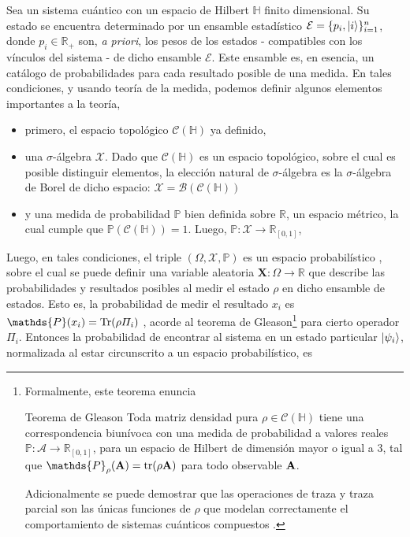 \documentclass{report} %
\numberwithin{equation}{section}
\begin{document}
Sea un sistema cuántico con un espacio de Hilbert $\mathds{H}$ finito dimensional. Su estado se encuentra determinado por un ensamble estadístico \cite{Nielsen.00, PATHRIA2011115} $\mathcal{E} = \{p_i,\ket{i}\}_{i=1}^{n}$, donde $p_i \in \mathds{R}_{+}$ son, \textit{a priori}, los pesos de los estados - compatibles con los vínculos del sistema - de dicho ensamble $\mathcal{E}$. Este ensamble es, en esencia, un catálogo de probabilidades para cada resultado posible de una medida. En tales condiciones, y usando teoría de la medida, podemos definir algunos elementos importantes a la teoría,

\begin{itemize}
    \item primero, el espacio topológico $\mathcal{C}(\mathds{H})$ ya definido,
    \item una $\sigma$-álgebra $\mathcal{X}$. Dado que  $\mathcal{C}(\mathds{H})$ es un espacio topológico, sobre el cual es posible distinguir elementos, la elección natural de $\sigma$-álgebra es la $\sigma$-álgebra de Borel de dicho espacio: $\mathcal{X} = \mathcal{B}(\mathcal{C}(\mathds{H}))$
    \item y una medida de probabilidad $\mathds{P}$ bien definida sobre $\mathds{R}$, un espacio métrico, la cual cumple que $\mathds{P}(\mathcal{C}(\mathds{H})) = 1.$ Luego, $\mathds{P}: \mathcal{X} \rightarrow \mathds{R}_{[0,1]}$, 
\end{itemize}

Luego, en tales condiciones, el triple $(\Omega, \mathcal{X}, \mathds{P})$ es un espacio probabilístico \cite{Bartle1995, munkres}, sobre el cual se puede definir una variable aleatoria $\mathbf{X}: \Omega \rightarrow \mathds{R}$ que describe las probabilidades y resultados posibles al medir el estado $\rho$ en dicho ensamble de estados. Esto es, la probabilidad de medir el resultado $x_i$ es $\mathds{P}(x_i) = \Tr(\rho \Pi_i)$ \cite{HeinzPetruccione, Portesi-ECI34, Holik-ECI34}, acorde al teorema de Gleason\footnote{Formalmente, este teorema enuncia 

\begin{theo}{Teorema de Gleason}{}
Toda matriz densidad pura $\rho \in \mathcal{C}(\mathds{H})$ tiene una correspondencia biunívoca con una medida de probabilidad a valores reales $\mathds{P}: \mathcal{A} \rightarrow \mathds{R}_{[0,1]}$, para un espacio de Hilbert de dimensión mayor o igual a 3, tal que $\mathds{P}_{\rho} ({\bf A}) = \tr (\rho {\bf A})$ para todo observable ${\bf A}$.
\end{theo}
Adicionalmente se puede demostrar que las operaciones de traza y traza parcial son las únicas funciones de $\rho$ que modelan correctamente el comportamiento de sistemas cuánticos compuestos \cite{BE07}.} para cierto operador $\Pi_i$. Entonces la probabilidad de encontrar al sistema en un estado particular $\ket{\psi_i}$, normalizada al estar circunscrito a un espacio probabilístico, es
\end{document}
